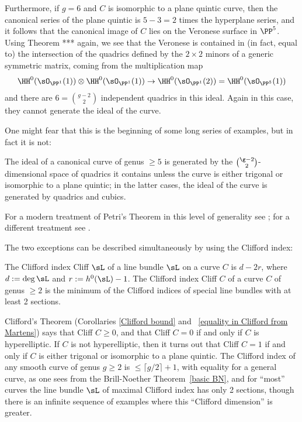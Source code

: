 Furthermore, if $g = 6$ and $C$ is isomorphic to a plane quintic curve, then the canonical series of the plane quintic is $5-3 = 2$ times the hyperplane series, and it follows that the canonical image of $C$ lies on the Veronese surface in $\PP^{5}$. Using Theorem *** again, we see that the Veronese is contained in (in fact, equal to) the intersection of the quadrics defined by the $2\times 2$ minors of a generic symmetric matrix, coming from the 
multiplication map 
$$
\HH^{0}(\sO_{\PP^{1}}(1))\otimes \HH^{0}(\sO_{\PP^{1}}(1)) \to \HH^{0}(\sO_{\PP^{1}}(2)) = \HH^{0}(\sO_{\PP^{5}}(1))
$$
and there are $6 = {g-2\choose 2}$ independent quadrics in this ideal. Again in this case, they cannot generate the ideal of the curve.

One might fear that this is the beginning of some long series of examples, but in fact it is not: 

\begin{theorem} [Petri]
The ideal of a canonical curve of genus $\geq 5$ is generated by the $\g-2\choose 2$-dimensional space of quadrics it contains unless the curve is either trigonal or isomorphic to a plane quintic; in the latter cases, the ideal of the curve is generated by quadrics and cubics.
\end{theorem}

For a modern treatment of Petri's Theorem in this level of generality see \cite{Schreyer}; for a different treatment see \cite{Arbarello-Sernesi}.

The two exceptions can be described simultaneously by using the Clifford index:

\begin{definition}
 The Clifford index Cliff $\sL$ of a line bundle $\sL$ on a curve $C$ is $d-2r$, where $d := \deg \sL$ and $r :=  h^0(\sL)-1$. The Clifford index Cliff $C$ of
 a curve $C$ of genus $\geq 2$ is the minimum of the Clifford indices of special line bundles with at least 2 sections.
\end{definition}

Clifford's Theorem (Corollaries \ref{Clifford bound} and ~\ref{equality in Clifford from Martens}) says that Cliff $C \geq 0$, and that Cliff $C = 0$ if and only if $C$ is hyperelliptic. If $C$ is not hyperelliptic, then it turns out that Cliff $C=1$ if and only if $C$ is either trigonal or isomorphic to a plane quintic. The Clifford index of any smooth curve of genus $g\geq 2$ is $\leq \lceil g/2\rceil+1$, with equality for a general curve, as one sees from the Brill-Noether Theorem~\ref{basic BN}, and for ``most'' curves the line bundle $\sL$ of maximal Clifford index has only 2 sections, though there is an infinite sequence of examples where this
``Clifford dimension'' is greater.

